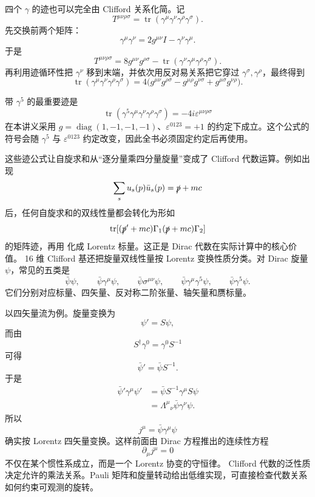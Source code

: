 四个 $\gamma$ 的迹也可以完全由 Clifford 关系化简。记
\[
T^{\mu\nu\rho\sigma}
=\operatorname{tr}(\gamma^\mu\gamma^\nu\gamma^\rho\gamma^\sigma).
\]
先交换前两个矩阵：
\[
\gamma^\mu\gamma^\nu
=2g^{\mu\nu}I-\gamma^\nu\gamma^\mu.
\]
于是
\[
T^{\mu\nu\rho\sigma}
=8g^{\mu\nu}g^{\rho\sigma}
-\operatorname{tr}(\gamma^\nu\gamma^\mu\gamma^\rho\gamma^\sigma).
\]
再利用迹循环性把 $\gamma^\nu$ 移到末端，并依次用反对易关系把它穿过 $\gamma^\sigma,\gamma^\rho$，最终得到
\begin{equation}
\boxed{
\operatorname{tr}(\gamma^\mu\gamma^\nu\gamma^\rho\gamma^\sigma)
=4\bigl(
 g^{\mu\nu}g^{\rho\sigma}
-g^{\mu\rho}g^{\nu\sigma}
+g^{\mu\sigma}g^{\nu\rho}
\bigr)
}.
\label{eq:gamma-trace-four}
\end{equation}

带 $\gamma^5$ 的最重要迹是
\begin{equation*}\boxed{
\operatorname{tr}(\gamma^5\gamma^\mu\gamma^\nu\gamma^\rho\gamma^\sigma)
=-4i\varepsilon^{\mu\nu\rho\sigma}
}\end{equation*}
在本讲义采用 $g=\operatorname{diag}(1,-1,-1,-1)$、$\varepsilon^{0123}=+1$ 的约定下成立。这个公式的符号会随 $\gamma^5$ 与 $\varepsilon^{0123}$ 约定改变，因此全书必须固定约定后再使用。

这些迹公式让自旋求和从“逐分量乘四分量旋量”变成了 Clifford 代数运算。例如出现
\[
\sum_su_s(p)\bar u_s(p)=\slashed p+mc
\]
后，任何自旋求和的双线性量都会转化为形如
\[
\operatorname{tr}
[(\slashed p'+mc)\Gamma_1(\slashed p+mc)\Gamma_2]
\]
的矩阵迹，再用  化成 Lorentz 标量。这正是 Dirac 代数在实际计算中的核心价值。
16 维 Clifford 基还把旋量双线性量按 Lorentz 变换性质分类。对 Dirac 旋量 $\psi$，常见的五类是
\[
\bar\psi\psi,
\qquad
\bar\psi\gamma^\mu\psi,
\qquad
\bar\psi\sigma^{\mu\nu}\psi,
\qquad
\bar\psi\gamma^\mu\gamma^5\psi,
\qquad
\bar\psi\gamma^5\psi.
\]
它们分别对应标量、四矢量、反对称二阶张量、轴矢量和赝标量。

以四矢量流为例。旋量变换为
\[
\psi' =S\psi,
\]
而由
\[
S^\dagger\gamma^0=\gamma^0S^{-1}
\]
可得
\[
\bar\psi'=\bar\psi S^{-1}.
\]
于是
\[
\begin{aligned}
\bar\psi'\gamma^\mu\psi'
&=\bar\psi S^{-1}\gamma^\mu S\psi\\
&=\Lambda^\mu{}_{\nu}\bar\psi\gamma^\nu\psi.
\end{aligned}
\]
所以
\[
j^\mu=\bar\psi\gamma^\mu\psi
\]
确实按 Lorentz 四矢量变换。这样前面由 Dirac 方程推出的连续性方程
\[
\partial_\mu j^\mu=0
\]
不仅在某个惯性系成立，而是一个 Lorentz 协变的守恒律。
Clifford 代数的泛性质决定允许的乘法关系。Pauli 矩阵和旋量转动给出低维实现，可直接检查代数关系如何约束可观测的旋转。




